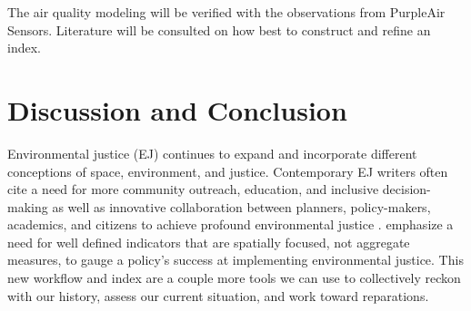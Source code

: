 \documentclass[article,12pt]{article}
\numberwithin{equation}{section}
\begin{document}
The air quality modeling will be verified with the observations from PurpleAir Sensors. Literature will be consulted on how best to construct and refine an index. 

\section*{Discussion and Conclusion}

	Environmental justice (EJ) continues to expand and incorporate different conceptions of space, environment, and justice. Contemporary EJ writers often cite a need for more community outreach, education, and inclusive decision-making as well as innovative collaboration between planners, policy-makers, academics, and citizens to achieve profound environmental justice \cite{walker2010, corburn2003, pearsall2010}. \textcite{pearsall2010} emphasize a need for well defined indicators that are spatially focused, not aggregate measures, to gauge a policy's success at implementing environmental justice. This new workflow and index are a couple more tools we can use to collectively reckon with our history, assess our current situation, and work toward reparations. 

\begingroup           %
\setlength\bibitemsep{12pt}  %
\printbibliography
\endgroup
\end{document}
